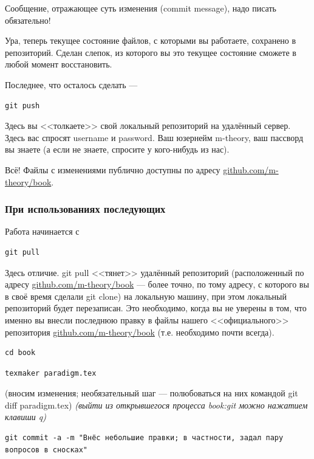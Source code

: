 \documentclass[11pt]{article}
\theoremstyle{remark}
\theoremstyle{definition}
\begin{document}
Сообщение, отражающее суть изменения (commit message), надо писать обязательно!

Ура, теперь текущее состояние файлов, с которыми вы работаете, сохранено в репозиторий. Сделан слепок, из которого вы это текущее состояние сможете в любой момент восстановить.

Последнее, что осталось сделать ---
\begin{verbatim}git push\end{verbatim}
Здесь вы <<толкаете>> свой локальный репозиторий на удалённый сервер.
Здесь вас спросят username и password. Ваш юзернейм m-theory, ваш пассворд вы знаете (а если не знаете, спросите у кого-нибудь из нас).


Всё! Файлы с изменениями публично доступны по адресу \href{https://github.com/m-theory/book}{\textcolor[rgb]{0.38,0.69,0.82}{github.com/m-theory/book}}.



\subsubsection{При использованиях последующих}

Работа начинается с

\begin{verbatim}git pull\end{verbatim}
Здесь отличие. git pull <<тянет>> удалённый репозиторий (расположенный по адресу \href{https://github.com/m-theory/book}{\textcolor[rgb]{0.38,0.69,0.82}{github.com/m-theory/book}} --- более точно, по тому адресу, с которого вы в своё время сделали git clone) на локальную машину, при этом локальный репозиторий будет перезаписан. Это необходимо, когда вы не уверены в том, что именно вы внесли последнюю правку в файлы нашего <<официального>> репозитория \href{https://github.com/m-theory/book}{\textcolor[rgb]{0.38,0.69,0.82}{github.com/m-theory/book}} (т.е. необходимо почти всегда).

\begin{verbatim}cd book\end{verbatim}

\begin{verbatim}texmaker paradigm.tex\end{verbatim} (вносим изменения; необязательный шаг --- полюбоваться на них командой git diff paradigm.tex) \textit{(выйти из открывшегося процесса book:git можно нажатием клавиши q)}



\begin{verbatim}git commit -a -m "Внёс небольшие правки; в частности, задал пару вопросов в сносках"\end{verbatim}
\end{document}
